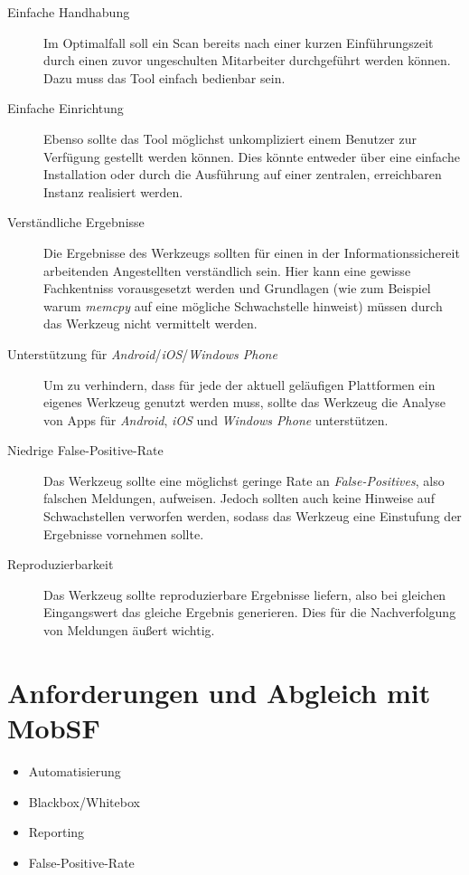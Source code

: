 \begin{description}
	\item[Einfache Handhabung] Im Optimalfall soll ein Scan bereits nach einer kurzen Einführungszeit durch einen zuvor ungeschulten Mitarbeiter durchgeführt werden können.  Dazu muss das Tool einfach bedienbar sein.
	
	\item[Einfache Einrichtung] Ebenso sollte das Tool möglichst unkompliziert einem Benutzer zur Verfügung gestellt werden können. Dies könnte entweder über eine einfache Installation oder durch die Ausführung auf einer zentralen, erreichbaren Instanz realisiert werden.
	
	\item[Verständliche Ergebnisse] Die Ergebnisse des Werkzeugs sollten für einen in der Informationssichereit arbeitenden Angestellten verständlich sein. Hier kann eine gewisse Fachkentniss vorausgesetzt werden und Grundlagen (wie zum Beispiel warum \textit{memcpy} auf eine mögliche Schwachstelle hinweist) müssen durch das Werkzeug nicht vermittelt werden.
	
	\item[Unterstützung für \textit{Android}/\textit{iOS}/\textit{Windows Phone}] Um zu verhindern, dass für jede der aktuell geläufigen Plattformen ein eigenes Werkzeug genutzt werden muss, sollte das Werkzeug die Analyse von Apps für \textit{Android}, \textit{iOS} und \textit{Windows Phone} unterstützen.
	
	\item[Niedrige False-Positive-Rate] Das Werkzeug sollte eine möglichst geringe Rate an \textit{False-Positives}, also falschen Meldungen, aufweisen. Jedoch sollten auch keine Hinweise auf Schwachstellen verworfen werden, sodass das Werkzeug eine  Einstufung der Ergebnisse vornehmen sollte.
	
	\item[Reproduzierbarkeit] Das Werkzeug sollte reproduzierbare Ergebnisse liefern, also bei gleichen Eingangswert das gleiche Ergebnis generieren. Dies für die Nachverfolgung von Meldungen äußert wichtig.
	
\end{description}





\section{Anforderungen und Abgleich mit MobSF}
\begin{itemize}
	\item Automatisierung
	\item Blackbox/Whitebox
	\item Reporting
	\item False-Positive-Rate
\end{itemize}
	
